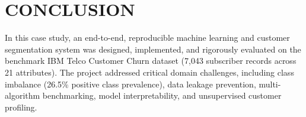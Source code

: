 \documentclass[12pt,a4paper]{report}
\newcommand{\datasetTotalRows}{7,043}
\newcommand{\datasetTotalCols}{21}
\newcommand{\datasetChurnProportion}{26.5\%}
\begin{document}
\chapter{CONCLUSION}

In this case study, an end-to-end, reproducible machine learning and customer segmentation system was designed, implemented, and rigorously evaluated on the benchmark IBM Telco Customer Churn dataset (\datasetTotalRows{} subscriber records across \datasetTotalCols{} attributes). The project addressed critical domain challenges, including class imbalance (\datasetChurnProportion{} positive class prevalence), data leakage prevention, multi-algorithm benchmarking, model interpretability, and unsupervised customer profiling.
\end{document}
